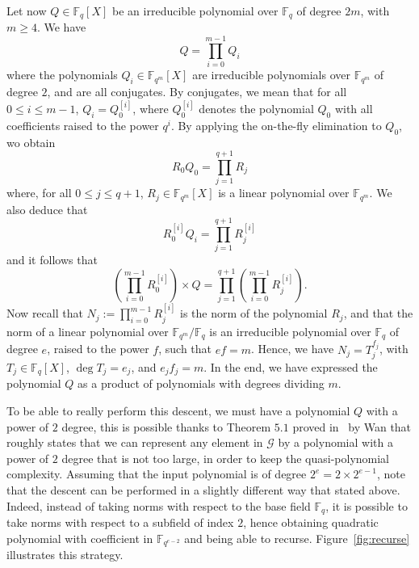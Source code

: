 \documentclass[a4paper,11pt]{article}
\theoremstyle{break}
\theoremstyle{sc}
\theoremstyle{definition}
\theoremstyle{remark}
\begin{document}
Let now $Q\in\mathbb{F}_{q}[X]$ be an irreducible polynomial over $\mathbb{F}_{q}$ of degree
$2m$, with $m\geq4$. We have
\[
  Q = \prod_{i=0}^{m-1}Q_{i}
\]
where the polynomials $Q_i\in\mathbb{F}_{q^m}[X]$ are irreducible
polynomials over $\mathbb{F}_{q^m}$ of degree $2$, and are all
conjugates. By conjugates, we mean that for all $0\leq i\leq m-1$,
$Q_i=Q_0^{[i]}$, where $Q_0^{[i]}$ denotes the polynomial $Q_0$ with all
coefficients raised to the power $q^i$. By applying the on-the-fly
elimination to $Q_0$, wo obtain 
\[
  R_0Q_0=\prod_{j=1}^{q+1}R_j
\]
where, for all $0\leq j\leq q+1$, $R_j\in\mathbb{F}_{q^m}[X]$ is a linear
polynomial over $\mathbb{F}_{q^m}$. We also deduce that
\[
  R_{0}^{[i]}Q_i=\prod_{j=1}^{q+1}R_j^{[i]}
\]
and it follows that
\[
  (\prod_{i=0}^{m-1}R_{0}^{[i]})\times Q =
  \prod_{j=1}^{q+1}(\prod_{i=0}^{m-1}R_j^{[i]}).
\]
Now recall that $N_j:=\prod_{i=0}^{m-1}R_{j}^{[i]}$ is the norm of the
polynomial $R_j$, and that the norm of a linear polynomial over
$\mathbb{F}_{q^m}/\mathbb{F}_q$ is an irreducible polynomial over
$\mathbb{F}_q$ of degree
$e$, raised to the power $f$, such that $ef=m$. Hence, we have
$N_j=T_j^{f_j}$, with $T_j\in\mathbb{F}_{q}[X]$, $\deg T_j = e_j$, and
$e_jf_j=m$. In the end, we have expressed the polynomial $Q$ as a product of
polynomials with degrees dividing $m$.

To be able to really perform this descent, we must have a polynomial $Q$ with a 
power of $2$ degree, this is possible thanks to Theorem $5.1$ proved 
in~\cite{Wan97} by Wan that roughly states that we can represent any element in
$\mathcal G$ by a polynomial with a power of $2$ degree that is not too large,
in order to keep the quasi-polynomial complexity. Assuming that the input
polynomial is of degree $2^e = 2\times 2^{e-1}$, note that the descent can be performed
in a slightly different way that stated above. Indeed,
instead of taking norms with respect to the base field $\mathbb{F}_q$,
it is possible to take norms with respect to a subfield of index $2$, hence
obtaining quadratic polynomial with coefficient in $\mathbb{F}_{q^{e-2}}$ and
being able to recurse. Figure~\ref{fig:recurse} illustrates this strategy.
\end{document}
